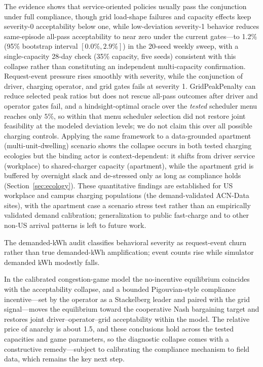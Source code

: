 \documentclass[12pt]{article}
\begin{document}
The evidence shows that service-oriented policies usually pass the conjunction under full compliance, though grid load-shape failures and capacity effects keep severity-0 acceptability below one, while low-deviation severity-1 behavior reduces same-episode all-pass acceptability to near zero under the current gates---to 1.2\% (95\% bootstrap interval $[0.0\%, 2.9\%]$) in the 20-seed weekly sweep, with a single-capacity 28-day check (35\% capacity, five seeds) consistent with this collapse rather than constituting an independent multi-capacity confirmation. Request-event pressure rises smoothly with severity, while the conjunction of driver, charging operator, and grid gates fails at severity 1. GridPeakPenalty can reduce selected peak ratios but does not rescue all-pass outcomes after driver and operator gates fail, and a hindsight-optimal oracle over the \emph{tested} scheduler menu reaches only $5\%$, so within that menu scheduler selection did not restore joint feasibility at the modeled deviation levels; we do not claim this over all possible charging controls. Applying the same framework to a data-grounded apartment (multi-unit-dwelling) scenario shows the collapse occurs in both tested charging ecologies but the binding actor is context-dependent: it shifts from driver service (workplace) to shared-charger capacity (apartment), while the apartment grid is buffered by overnight slack and de-stressed only as long as compliance holds (Section~\ref{sec:ecology}). These quantitative findings are established for US workplace and campus charging populations (the demand-validated ACN-Data sites), with the apartment case a scenario stress test rather than an empirically validated demand calibration; generalization to public fast-charge and to other non-US arrival patterns is left to future work.

The demanded-kWh audit classifies behavioral severity as request-event churn rather than true demanded-kWh amplification; event counts rise while simulator demanded kWh modestly falls.

In the calibrated congestion-game model the no-incentive equilibrium coincides with the acceptability collapse, and a bounded Pigouvian-style compliance incentive---set by the operator as a Stackelberg leader and paired with the grid signal---moves the equilibrium toward the cooperative Nash bargaining target and restores joint driver--operator--grid acceptability within the model. The relative price of anarchy is about 1.5, and these conclusions hold across the tested capacities and game parameters, so the diagnostic collapse comes with a constructive remedy---subject to calibrating the compliance mechanism to field data, which remains the key next step.
\end{document}
